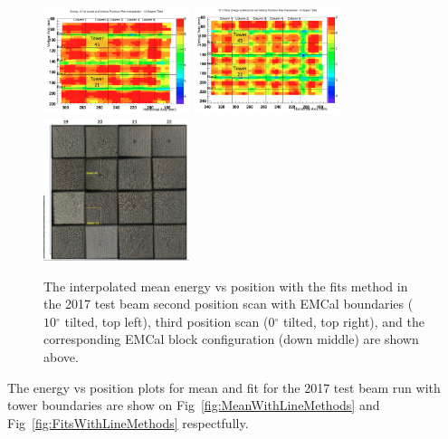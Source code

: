 \documentclass[hidelinks,11pt]{article}
\numberwithin{figure}{section}
\numberwithin{table}{section}
\newcommand{\degree}{\mbox{$^\circ$}\xspace}
\begin{document}
\begin{figure}[hbtp]
\begin{center}
\includegraphics[width=0.38\textwidth]{Plots/BlockConfig/Inter20172ndScanLabeled.png}
\includegraphics[width=0.38\textwidth]{Plots/BlockConfig/Inter20173rdScanLabeled.png}
\includegraphics[width=0.38\textwidth]{Plots/BlockConfig/BlockConfig.png}
\caption{The interpolated mean energy vs position with the fits method in the 2017 test beam second position scan with EMCal boundaries ($10 \degree$ tilted, top left), third position scan ($0 \degree$ tilted, top right), and the corresponding EMCal block configuration (down middle) are shown above.}
\label{fig:BlockEMCAL}
\end{center}
\end{figure} 

The energy vs position plots for mean and fit for the  2017 test beam run with tower boundaries are show on Fig~\ref{fig:MeanWithLineMethods} and Fig~\ref{fig:FitsWithLineMethods} respectfully. 
\end{document}
